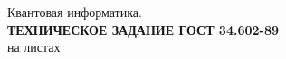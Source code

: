 \documentclass[a4paper,14pt]{extreport}
\begin{document}
    \begin{titlepage}
        \clearpage
        \vspace*{\fill}
        \begin{center}
            \large
            \begin{minipage}{\textwidth}
                \centering
                Квантовая информатика.\\
                \textbf{ТЕХНИЧЕСКОЕ ЗАДАНИЕ ГОСТ 34.602-89}\\
                на \pageref{LastPage} листах
            \end{minipage}
        \end{center}
        \vfill
        \clearpage
    \end{titlepage}
    \tableofcontents
    \newpage
    
\end{document}
